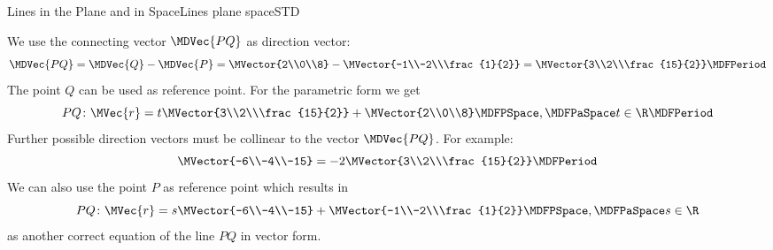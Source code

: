 \begin{MXContent}{Lines in the Plane and in Space}{Lines plane space}{STD}
\begin{MExample}
We use the connecting vector $\MDVec{P Q}$ as direction vector:
\[
 \MDVec{P Q}=\MDVec{Q}-\MDVec{P}=\MVector{2\\0\\8}-\MVector{-1\\-2\\\frac{1}{2}}=\MVector{3\\2\\\frac{15}{2}}\MDFPeriod
\]
The point $Q$ can be used as reference point. For the parametric form we get
\[
 P Q\colon \MVec{r}=t\MVector{3\\2\\\frac{15}{2}}+\MVector{2\\0\\8}\MDFPSpace,\MDFPaSpace t\in\R\MDFPeriod
\]
Further possible direction vectors must be collinear to the vector $\MDVec{P Q}$. For example:
\[
 \MVector{-6\\-4\\-15}=-2\MVector{3\\2\\\frac{15}{2}}\MDFPeriod
\]
We can also use the point $P$ as reference point which results in
\[
 P Q\colon \MVec{r}=s\MVector{-6\\-4\\-15}+\MVector{-1\\-2\\\frac{1}{2}}\MDFPSpace,\MDFPaSpace s\in\R
\]
as another correct equation of the line $P Q$ in vector form.
\end{MExample}


\end{MXContent}
